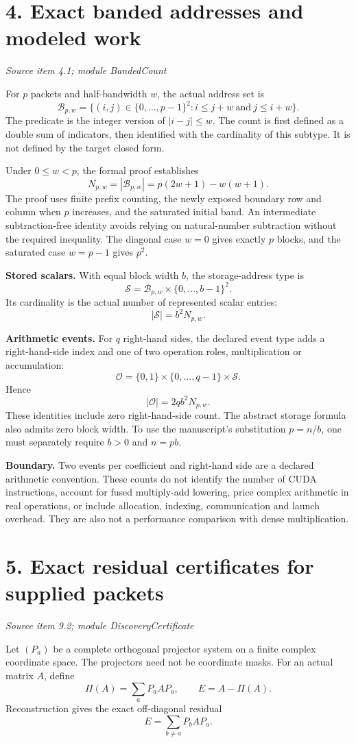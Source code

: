 \documentclass[11pt]{article}
\newcommand{\pageheading}[2]{\section*{\color{ink}#1}\textit{#2}\par}
\begin{document}
\newpage
\pageheading{4. Exact banded addresses and modeled work}{Source item 4.1; module BandedCount}
For $p$ packets and half-bandwidth $w$, the actual address set is
\[
\mathcal B_{p,w}
=\{(i,j)\in\{0,\ldots,p-1\}^2:
 i\leq j+w\ \text{and}\ j\leq i+w\}.
\]
The predicate is the integer version of $|i-j|\leq w$. The count is first defined as a double sum of indicators, then identified with the cardinality of this subtype. It is not defined by the target closed form.

Under $0\leq w<p$, the formal proof establishes
\[
\boxed{N_{p,w}=|\mathcal B_{p,w}|=p(2w+1)-w(w+1).}
\]
The proof uses finite prefix counting, the newly exposed boundary row and column when $p$ increases, and the saturated initial band. An intermediate subtraction-free identity avoids relying on natural-number subtraction without the required inequality. The diagonal case $w=0$ gives exactly $p$ blocks, and the saturated case $w=p-1$ gives $p^2$.

\textbf{Stored scalars.} With equal block width $b$, the storage-address type is
\[
\mathcal S=\mathcal B_{p,w}\times\{0,\ldots,b-1\}^2.
\]
Its cardinality is the actual number of represented scalar entries:
\[
\boxed{|\mathcal S|=b^2N_{p,w}.}
\]

\textbf{Arithmetic events.} For $q$ right-hand sides, the declared event type adds a right-hand-side index and one of two operation roles, multiplication or accumulation:
\[
\mathcal O=\{0,1\}\times\{0,\ldots,q-1\}\times\mathcal S.
\]
Hence
\[
\boxed{|\mathcal O|=2qb^2N_{p,w}.}
\]
These identities include zero right-hand-side count. The abstract storage formula also admits zero block width. To use the manuscript's substitution $p=n/b$, one must separately require $b>0$ and $n=pb$.

\textbf{Boundary.} Two events per coefficient and right-hand side are a declared arithmetic convention. These counts do not identify the number of CUDA instructions, account for fused multiply-add lowering, price complex arithmetic in real operations, or include allocation, indexing, communication and launch overhead. They are also not a performance comparison with dense multiplication.

\newpage
\pageheading{5. Exact residual certificates for supplied packets}{Source item 9.2; module DiscoveryCertificate}
Let $(P_a)$ be a complete orthogonal projector system on a finite complex coordinate space. The projectors need not be coordinate masks. For an actual matrix $A$, define
\[
\Pi(A)=\sum_aP_aAP_a,
\qquad E=A-\Pi(A).
\]
Reconstruction gives the exact off-diagonal residual
\[
E=\sum_{b\ne a}P_bAP_a.
\]
\end{document}
